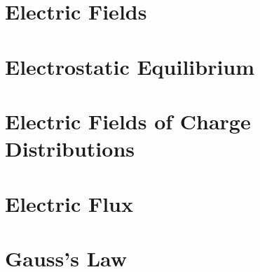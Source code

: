 \documentclass[../em.tex]{subfiles}
\begin{document}
\section{Electric Fields}
\section{Electrostatic Equilibrium}
\section{Electric Fields of Charge Distributions}
\section{Electric Flux}
\section{Gauss's Law}
\end{document}
